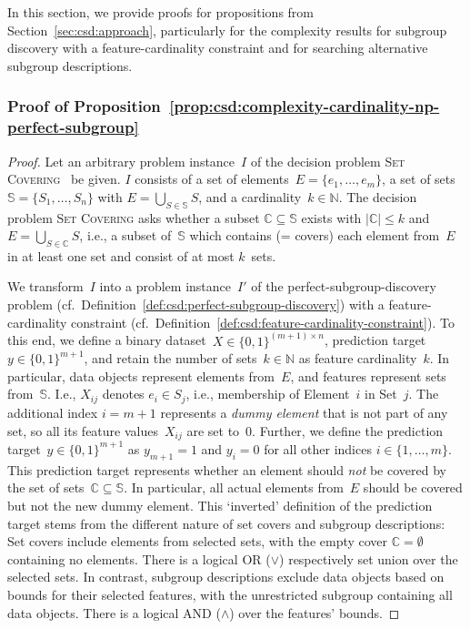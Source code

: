 \documentclass{article}
\theoremstyle{definition}
\begin{document}
In this section, we provide proofs for propositions from Section~\ref{sec:csd:approach}, particularly for the complexity results for subgroup discovery with a feature-cardinality constraint and for searching alternative subgroup descriptions.

\subsubsection{Proof of Proposition~\ref{prop:csd:complexity-cardinality-np-perfect-subgroup}}
\label{sec:csd:appendix:proofs:complexity-cardinality-np-perfect-subgroup}

\begin{proof}
Let an arbitrary problem instance~$I$ of the decision problem \textsc{Set Covering}~\cite{karp1972reducibility} be given.
$I$ consists of a set of elements~$E = \{e_1, \dots, e_m\}$, a set of sets~$\mathbb{S} = \{S_1,  \dots, S_n\}$ with $E = \bigcup_{S \in \mathbb{S}} S$, and a cardinality~$k \in \mathbb{N}$.
The decision problem \textsc{Set Covering} asks whether a subset $\mathbb{C} \subseteq \mathbb{S}$ exists with $|\mathbb{C}| \leq k$ and $E = \bigcup_{S \in \mathbb{C}} S$, i.e., a subset of~$\mathbb{S}$ which contains (= covers) each element from~$E$ in at least one set and consist of at most $k$~sets.

We transform~$I$ into a problem instance~$I'$ of the perfect-subgroup-discovery problem (cf.~Definition~\ref{def:csd:perfect-subgroup-discovery}) with a feature-cardinality constraint (cf.~Definition~\ref{def:csd:feature-cardinality-constraint}).
To this end, we define a binary dataset~$X \in \{0, 1\}^{(m + 1) \times n}$, prediction target~$y \in \{0, 1\}^{m+1}$, and retain the number of sets~$k \in \mathbb{N}$ as feature cardinality~$k$.
In particular, data objects represent elements from~$E$, and features represent sets from~$\mathbb{S}$.
I.e., $X_{ij}$ denotes $e_i \in S_j$, i.e., membership of Element~$i$ in Set~$j$.
The additional index $i = m + 1$ represents a \emph{dummy element} that is not part of any set, so all its feature values~$X_{ij}$ are set to~0.
Further, we define the prediction target~$y \in \{0, 1\}^{m+1}$ as $y_{m+1} = 1$ and $y_i = 0$ for all other indices $i \in \{1, \dots, m\}$.
This prediction target represents whether an element should \emph{not} be covered by the set of sets~$\mathbb{C} \subseteq \mathbb{S}$.
In particular, all actual elements from~$E$ should be covered but not the new dummy element.
This `inverted' definition of the prediction target stems from the different nature of set covers and subgroup descriptions:
Set covers include elements from selected sets, with the empty cover $\mathbb{C} = \emptyset$ containing no elements.
There is a logical OR ($\lor$) respectively set union over the selected sets.
In contrast, subgroup descriptions exclude data objects based on bounds for their selected features, with the unrestricted subgroup containing all data objects.
There is a logical AND ($\land$) over the features' bounds.


\end{proof}
\end{document}
